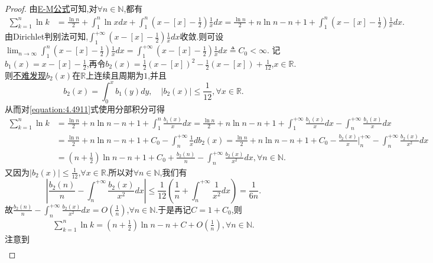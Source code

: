 \documentclass[lang=cn,newtx,10pt,scheme=chinese]{elegantbook}
\begin{document}
\begin{proof}
由\hyperref[proposition:0阶欧拉麦克劳林公式(0阶E-M公式)]{E-M公式}可知,对\(\forall n\in\mathbb{N}\),都有
\begin{align}\label{equation:4.4911}
\sum_{k = 1}^n\ln k&=\frac{\ln n}{2}+\int_1^n\ln xdx+\int_1^n\left(x - [x] - \frac{1}{2}\right)\frac{1}{x}dx
=\frac{\ln n}{2}+n\ln n - n + 1+\int_1^n\left(x - [x] - \frac{1}{2}\right)\frac{1}{x}dx.
\end{align}
由Dirichlet判别法可知,\(\int_1^{+\infty}\left(x - [x] - \frac{1}{2}\right)\frac{1}{x}dx\)收敛.则可设\(\lim_{n\rightarrow\infty}\int_1^n\left(x - [x] - \frac{1}{2}\right)\frac{1}{x}dx=\int_1^{+\infty}\left(x - [x] - \frac{1}{2}\right)\frac{1}{x}dx\triangleq C_0<\infty\).
记\(b_1(x)=x - [x] - \frac{1}{2}\),再令\(b_2(x)=\frac{1}{2}(x - [x])^2 - \frac{1}{2}(x - [x]) + \frac{1}{12}\),\(x\in\mathbb{R}\).则\hyperlink{b2性质}{不难发现}\(b_2(x)\)在\(\mathbb{R}\)上连续且周期为\(1\),并且
\[
b_2(x)=\int_0^x{b_1(y)dy}, \quad |b_2(x)|\leqslant\frac{1}{12}, \forall x\in\mathbb{R}.
\]
从而对\eqref{equation:4.4911}式使用分部积分可得
\begin{align*}
\sum_{k=1}^n{\ln k}&=\frac{\ln n}{2}+n\ln n-n+1+\int_1^n{\frac{b_1\left( x \right)}{x}dx}=\frac{\ln n}{2}+n\ln n-n+1+\int_1^{+\infty}{\frac{b_1\left( x \right)}{x}dx}-\int_n^{+\infty}{\frac{b_1\left( x \right)}{x}dx}
\\
&=\frac{\ln n}{2}+n\ln n-n+1+C_0-\int_n^{+\infty}{\frac{1}{x}db_2\left( x \right)}=\frac{\ln n}{2}+n\ln n-n+1+C_0-\frac{b_2\left( x \right)}{x}\Big|_{n}^{+\infty}-\int_n^{+\infty}{\frac{b_2\left( x \right)}{x^2}dx}
\\
&=\left( n+\frac{1}{2} \right) \ln n-n+1+C_0+\frac{b_2\left( n \right)}{n}-\int_n^{+\infty}{\frac{b_2\left( x \right)}{x^2}dx},\forall n\in\mathbb{N}.
\end{align*}
又因为\(|b_2(x)|\leqslant\frac{1}{12}\),\(\forall x\in\mathbb{R}\).所以对\(\forall n\in\mathbb{N}\),我们有
\[
\left|\frac{b_2(n)}{n} - \int_n^{+\infty}\frac{b_2(x)}{x^2}dx\right|\leqslant\frac{1}{12}\left(\frac{1}{n}+\int_n^{+\infty}\frac{1}{x^2}dx\right)=\frac{1}{6n}.
\]
故\(\frac{b_2(n)}{n} - \int_n^{+\infty}\frac{b_2(x)}{x^2}dx = O\left(\frac{1}{n}\right)\),\(\forall n\in\mathbb{N}\).于是再记\(C = 1 + C_0\),则
\begin{align}\label{equation:4491}
\sum_{k = 1}^n\ln k=\left(n + \frac{1}{2}\right)\ln n - n + C + O\left(\frac{1}{n}\right),\forall n\in\mathbb{N} .
\end{align}
注意到
\begin{align}\label{equation:4492}

\end{align}
\end{proof}
\end{document}
